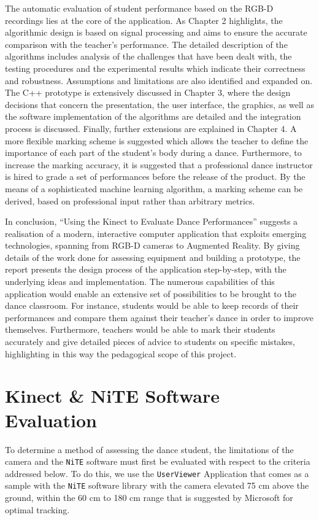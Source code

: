\documentclass[11pt,a4paper]{article}
\begin{document}
\noindent
The automatic evaluation of student performance based on the RGB-D recordings lies at the core of the application. As Chapter 2 highlights, the algorithmic design is based on signal processing and aims to ensure the accurate comparison with the teacher's performance. The detailed description of the algorithms includes analysis of the challenges that have been dealt with, the testing procedures and the experimental results which indicate their correctness and robustness. Assumptions and limitations are also identified and expanded on. The C++ prototype is extensively discussed in Chapter 3, where the design decisions that concern the presentation, the user interface, the graphics, as well as the software implementation of the algorithms are detailed and the integration process is discussed. Finally, further extensions are explained in Chapter 4. A more flexible marking scheme is suggested which allows the teacher to define the importance of each part of the student’s body during a dance. Furthermore, to increase the marking accuracy, it is suggested that a professional dance instructor is hired to grade a set of performances before the release of the product. By the means of a sophisticated machine learning algorithm, a marking scheme can be derived, based on professional input rather than arbitrary metrics.

\noindent
In conclusion, ``Using the Kinect to Evaluate Dance Performances'' suggests a realisation of a modern, interactive computer application that exploits emerging technologies, spanning from RGB-D cameras to Augmented Reality. By giving details of the work done for assessing equipment and building a prototype, the report presents the design process of the application step-by-step, with the underlying ideas and implementation. The numerous capabilities of this application would enable an extensive set of possibilities to be brought to the dance classroom. For instance, students would be able to keep records of their performances and compare them against their teacher's dance in order to improve themselves. Furthermore, teachers would be able to mark their students accurately and give detailed pieces of advice to students on specific mistakes, highlighting in this way the pedagogical scope of this project.

\clearpage

\setcounter{page}{1}
\section{Kinect \& NiTE Software Evaluation}
\noindent
To determine a method of assessing the dance student, the limitations of the camera and the \texttt{NiTE} software must first be evaluated with respect to the criteria addressed below. To do this, we use the \texttt{UserViewer} Application that comes as a sample with the \texttt{NiTE} software library with the camera elevated 75 cm above the ground, within the 60 cm to 180 cm range that is suggested by Microsoft for optimal tracking. 
\end{document}
